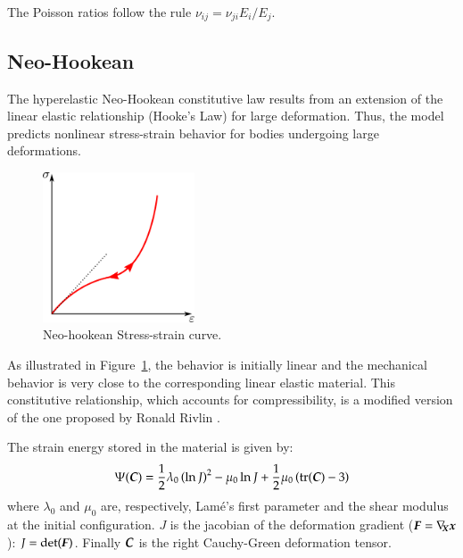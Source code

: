 The Poisson ratios follow the rule $\nu_{ij} = \nu_{ji} E_i / E_j$.

\subsection{Neo-Hookean}
The hyperelastic Neo-Hookean constitutive law results from an
extension of the linear elastic relationship (Hooke's Law) for large
deformation. Thus, the model predicts nonlinear stress-strain behavior
for bodies undergoing large deformations.

\begin{figure}[!htb]
  \begin{center}
    \includegraphics[width=0.4\textwidth,keepaspectratio=true]{figures/stress_strain_neo.pdf}
    \caption{Neo-hookean Stress-strain curve.}
    \label{fig:smm:cl:neo_hookean}
  \end{center}
\end{figure}

As illustrated in Figure~\ref{fig:smm:cl:neo_hookean}, the behavior is initially
linear and the mechanical behavior is very close to the corresponding linear
elastic material. This constitutive relationship, which accounts for compressibility,
is a modified version of the one proposed by Ronald Rivlin \cite{Belytschko:2000}.

The strain energy stored in the material is given by:
\begin{equation}\label{eqn:smm:constitutive:neohookean_potential}
  \Psi(\boldsymbol{C}) = \frac{1}{2}\lambda_0\left(\ln J\right)^2-\mu_0\ln J+\frac{1}{2}
  \mu_0\left(\mathrm{tr}(\boldsymbol{C})-3\right)
\end{equation}
\noindent where $\lambda_0$ and $\mu_0$ are, respectively, Lam\'e's first parameter
and the shear modulus at the initial configuration. $J$ is the jacobian of the deformation
gradient ($\boldsymbol{F}=\nabla_{\!\!\boldsymbol{X}}\boldsymbol{x}$): $J=\text{det}(\boldsymbol{F})$. Finally $\boldsymbol{C}$ is the right Cauchy-Green
deformation tensor.

